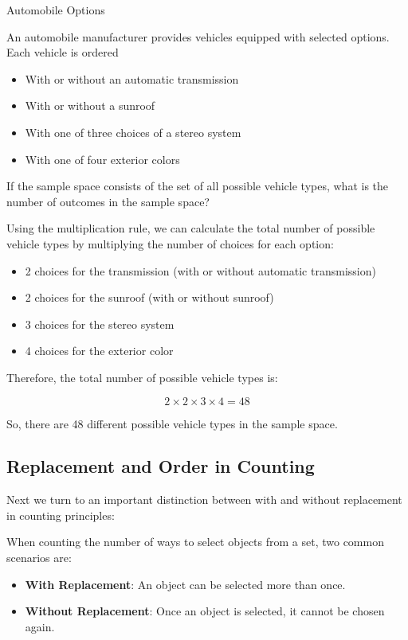 \begin{example} Automobile Options

An automobile manufacturer provides vehicles equipped with selected
options. Each vehicle is ordered

\begin{itemize}
    \item With or without an automatic transmission
    \item With or without a sunroof
    \item With one of three choices of a stereo system
    \item With one of four exterior colors
\end{itemize}

If the sample space consists of the set of all possible vehicle types, what is the number of outcomes in the sample space?
\end{example}

\begin{solution}
Using the multiplication rule, we can calculate the total number of possible vehicle types by multiplying the number of choices for each option:

\begin{itemize}
    \item 2 choices for the transmission (with or without automatic transmission)
    \item 2 choices for the sunroof (with or without sunroof)
    \item 3 choices for the stereo system
    \item 4 choices for the exterior color
\end{itemize}

Therefore, the total number of possible vehicle types is:

\[
2 \times 2 \times 3 \times 4 = 48
\]

So, there are 48 different possible vehicle types in the sample space.
\end{solution}

\subsection*{Replacement and Order in Counting}

Next we turn to an important distinction between with and without replacement in counting principles:

\begin{definition}
    When counting the number of ways to select objects from a set, two common scenarios are:

    \begin{itemize}
        \item \textbf{With Replacement}: An object can be selected more than once.
        \item \textbf{Without Replacement}: Once an object is selected, it cannot be chosen again.
    \end{itemize}
    \end{definition}
    
